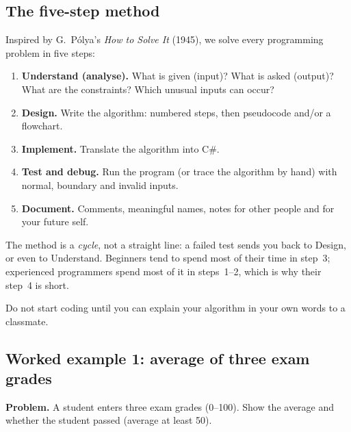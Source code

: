 \documentclass[11pt,a4paper]{article}
\newcommand{\term}[1]{\textbf{\color{ink}#1}}
\begin{document}
\subsection{The five-step method}
Inspired by G.~P\'olya's \emph{How to Solve It} (1945), we solve every programming problem in five steps:
\begin{enumerate}[leftmargin=*,itemsep=2pt]
  \item \term{Understand (analyse).} What is given (input)? What is asked (output)? What are the constraints? Which unusual inputs can occur?
  \item \term{Design.} Write the algorithm: numbered steps, then pseudocode and/or a flowchart.
  \item \term{Implement.} Translate the algorithm into C\#.
  \item \term{Test and debug.} Run the program (or trace the algorithm by hand) with normal, boundary and invalid inputs.
  \item \term{Document.} Comments, meaningful names, notes for other people and for your future self.
\end{enumerate}
The method is a \emph{cycle}, not a straight line: a failed test sends you back to Design, or even to Understand. Beginners tend to spend most of their time in step~3; experienced programmers spend most of it in steps~1--2, which is why their step~4 is short.

\begin{notebox}
Do not start coding until you can explain your algorithm in your own words to a classmate.
\end{notebox}

\subsection{Worked example 1: average of three exam grades}
\textbf{Problem.} A student enters three exam grades (0--100). Show the average and whether the student passed (average at least 50).
\end{document}
